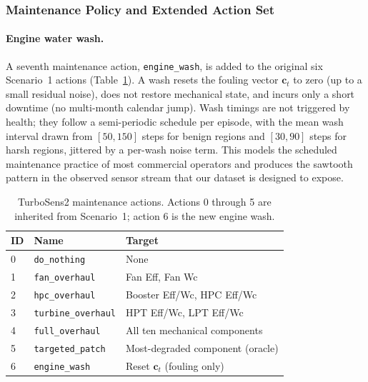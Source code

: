 \subsubsection{Maintenance Policy and Extended Action Set}
\label{sec:scen4_maintenance}

\paragraph{Engine water wash.}
A seventh maintenance action, \texttt{engine\_wash}, is added to the
original six Scenario~1 actions (Table~\ref{tab:scen4_actions}). A wash resets
the fouling vector $\mathbf{c}_t$ to zero (up to a small residual
noise), does not restore mechanical state, and incurs only a short
downtime (no multi-month calendar jump).
Wash timings are not triggered by health; they follow a semi-periodic
schedule per episode, with the mean wash interval drawn from
$[50, 150]$ steps for benign regions and $[30, 90]$ steps for harsh
regions, jittered by a per-wash noise term. This models the scheduled
maintenance practice of most commercial operators and produces the
sawtooth pattern in the observed sensor stream that our dataset is
designed to expose.

\begin{table}[h]
\centering
\caption{TurboSens2 maintenance actions. Actions 0 through 5 are
inherited from Scenario~1; action 6 is the new engine wash.}
\label{tab:scen4_actions}
\small
\begin{tabular}{llp{6.5cm}}
\toprule
ID & Name & Target \\
\midrule
0 & \texttt{do\_nothing}       & None \\
1 & \texttt{fan\_overhaul}     & Fan Eff, Fan Wc \\
2 & \texttt{hpc\_overhaul}     & Booster Eff/Wc, HPC Eff/Wc \\
3 & \texttt{turbine\_overhaul} & HPT Eff/Wc, LPT Eff/Wc \\
4 & \texttt{full\_overhaul}    & All ten mechanical components \\
5 & \texttt{targeted\_patch}   & Most-degraded component (oracle) \\
6 & \texttt{engine\_wash}      & Reset $\mathbf{c}_t$ (fouling only) \\
\bottomrule
\end{tabular}
\end{table}

